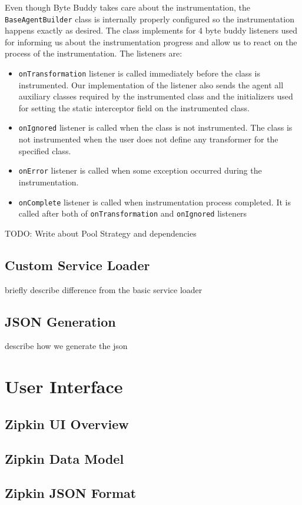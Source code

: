 Even though Byte Buddy takes care about the instrumentation, the \texttt{BaseAgentBuilder} class is internally properly configured so the instrumentation happens exactly as desired. The class implements for 4 byte buddy listeners used for informing us about the instrumentation progress and allow us to react on the process of the instrumentation. The listeners are:
\begin{itemize}
	\item \texttt{onTransformation} listener is called immediately before the class is instrumented. Our implementation of the listener also sends the agent all auxiliary classes required by the instrumented class and the initializers used for setting the static interceptor field on the instrumented class.
	\item \texttt{onIgnored} listener is called when the class is not instrumented. The class is not instrumented when the user does not define any transformer for the specified class.
	\item \texttt{onError} listener is called when some exception occurred during the instrumentation.
	\item \texttt{onComplete} listener is called when instrumentation process completed. It is called after both of \texttt{onTransformation} and \texttt{onIgnored} listeners
\end{itemize}

TODO: Write about Pool Strategy and  dependencies
\subsection{Custom Service Loader}
briefly describe difference from the basic service loader
\subsection{JSON Generation}
describe how we generate the json 

\section{User Interface}
\label{sec:zipkin_ui}
\subsection{Zipkin UI Overview}
\subsection{Zipkin Data Model}
\subsection{Zipkin JSON Format}
